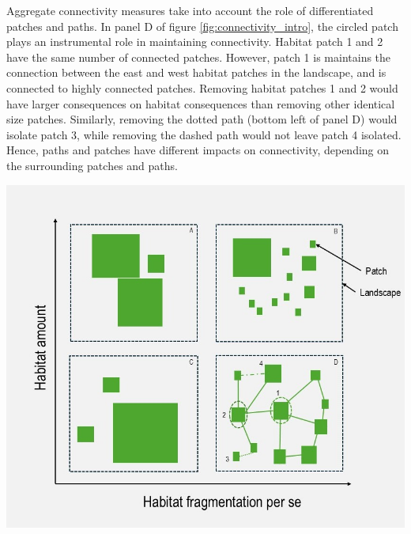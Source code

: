 \begin{tcolorbox}[breakable, 
colback =verylightgray, 
colframe=gray!75!black,
title={Box 2 - Habitat Loss, Fragmentation and Connectivity},
fontupper=\small]
 Aggregate connectivity measures take into account the role of differentiated patches and paths. In panel D of figure \ref{fig:connectivity_intro}, the circled patch plays an instrumental role in maintaining connectivity. Habitat patch 1 and 2 have the same number of connected patches. However, patch 1 is maintains the connection between the east and west habitat patches in the landscape, and is connected to highly connected patches. Removing habitat patches 1 and 2 would have larger consequences on habitat consequences than removing other identical size patches. Similarly, removing the dotted path (bottom left of panel D) would isolate patch 3, while removing the dashed path would not leave patch 4 isolated. Hence, paths and patches have different impacts on connectivity, depending on the surrounding patches and paths.
\\%
\begin{center}
\includegraphics[width = .8\textwidth]{figures/intro/fragmentation.jpg}
\label{fig:connectivity_intro}
\end{center}


\end{tcolorbox}

